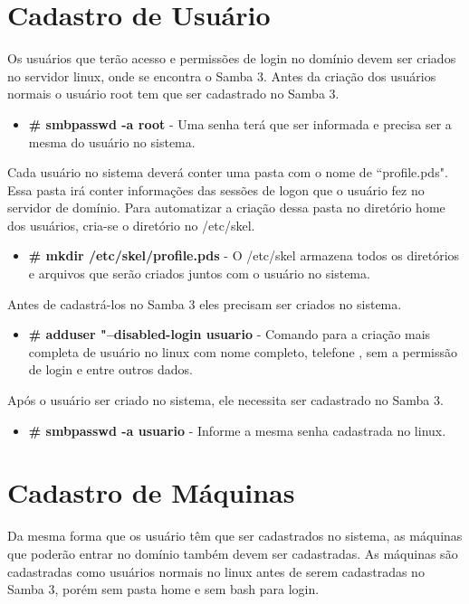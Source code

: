 \section{Cadastro de Usuário}

Os usuários que terão acesso e permissões de login no domínio devem ser criados no servidor linux, onde se encontra o Samba 3. Antes da criação dos usuários normais o usuário root tem que ser cadastrado no Samba 3.

\begin{itemize}
	\item \textbf {\# smbpasswd -a root} - Uma senha terá que ser informada e precisa ser a mesma do usuário no sistema.
\end{itemize}

Cada usuário no sistema deverá conter uma pasta com o nome de ``profile.pds". Essa pasta irá conter informações das sessões de logon que o usuário fez no servidor de domínio. Para automatizar a criação dessa pasta no diretório home dos usuários, cria-se o diretório no /etc/skel.

\begin{itemize}
	\item \textbf{\# mkdir /etc/skel/profile.pds} - O /etc/skel armazena todos os diretórios e arquivos que serão criados juntos com o usuário no sistema.
\end{itemize}

Antes de cadastrá-los no Samba 3 eles precisam ser criados no sistema.

\begin{itemize}
	\item \textbf{\# adduser "--disabled-login usuario} - Comando para a criação mais completa de usuário no linux com nome completo, telefone , sem a permissão de login e entre outros dados.
\end{itemize}

Após o usuário ser criado no sistema, ele necessita ser cadastrado no Samba 3.

\begin{itemize}
	\item \textbf{\# smbpasswd -a usuario} - Informe a mesma senha cadastrada no linux.
\end{itemize}

\section{Cadastro de Máquinas}

Da mesma forma que os usuário têm que ser cadastrados no sistema, as máquinas que poderão entrar no domínio também devem ser cadastradas. As máquinas são cadastradas como usuários normais no linux antes de serem cadastradas no Samba 3, porém sem pasta home e sem bash para login.

